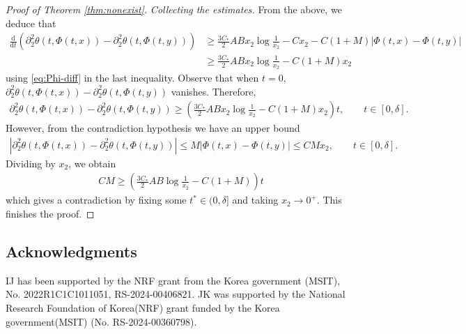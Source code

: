 \documentclass[10pt]{amsart}
\theoremstyle{definition}
\theoremstyle{remark}
\numberwithin{equation}{section}
\newcommand{\ud}{\mathrm{d}}
\newcommand{\0}{\emptyset}
\newcommand{\dlt}{\delta}
\begin{document}
\begin{proof}[Proof of Theorem \ref{thm:nonexist}]
			\noindent \textit{Collecting the estimates.} From the above, we deduce that \begin{equation*}
				\begin{split}
					\frac{\ud}{\ud t} \left( \partial_2^2 \theta(t,\Phi(t,x)) - \partial_2^2 \theta(t,\Phi(t,y)) \right)  & \ge \frac{3C_*}{2} A B x_{2} \log \frac{1}{x_2} - C x_{2}  - C(1+M)|\Phi(t,x) - \Phi(t,y)| \\
					&  \ge \frac{3C_*}{2} A B x_{2} \log \frac{1}{x_2} - C (1 +M) x_{2} 
				\end{split}
			\end{equation*} using \eqref{eq:Phi-diff} in the last inequality. Observe that when $t = 0$, $\partial_2^2 \theta(t,\Phi(t,x)) - \partial_2^2 \theta(t,\Phi(t,y))$ vanishes. Therefore, \begin{equation*}
				\begin{split}
					\partial_2^2 \theta(t,\Phi(t,x)) - \partial_2^2 \theta(t,\Phi(t,y)) \ge (\frac{3C_*}{2} A B x_{2} \log \frac{1}{x_2} - C (1 +M) x_{2} )t, \qquad t \in [0,\dlt]. 
				\end{split}
			\end{equation*} However, from the contradiction hypothesis we have an upper bound \begin{equation*}
				\begin{split}
					\left| 	\partial_2^2 \theta(t,\Phi(t,x)) - \partial_2^2 \theta(t,\Phi(t,y))  \right| \le M|\Phi(t,x) - \Phi(t,y)| \le CM x_{2}, \qquad t \in [0,\dlt]. 
				\end{split}
			\end{equation*} Dividing by $x_{2}$, we obtain \begin{equation*}
				\begin{split}
					CM \ge (\frac{3C_*}{2} A B  \log \frac{1}{x_2} - C (1 +M) )t
				\end{split}
			\end{equation*} which gives a contradiction by fixing some $t^* \in (0,\dlt]$ and taking $x_{2} \to 0^+$. This finishes the proof. 
		\end{proof} 
		
		
		
	
	\subsection*{Acknowledgments} IJ has been supported by the NRF grant from the Korea government (MSIT), No. 2022R1C1C1011051, RS-2024-00406821. JK was supported by the National Research Foundation of Korea(NRF) grant funded by the Korea government(MSIT) (No. RS-2024-00360798).
		
\end{document}
